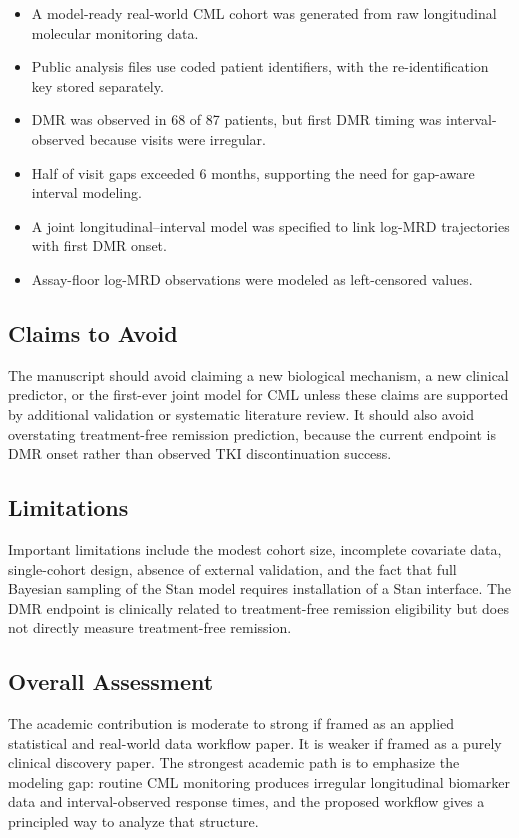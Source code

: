 \begin{itemize}
  \item A model-ready real-world CML cohort was generated from raw longitudinal molecular monitoring data.
  \item Public analysis files use coded patient identifiers, with the re-identification key stored separately.
  \item DMR was observed in 68 of 87 patients, but first DMR timing was interval-observed because visits were irregular.
  \item Half of visit gaps exceeded 6 months, supporting the need for gap-aware interval modeling.
  \item A joint longitudinal--interval model was specified to link log-MRD trajectories with first DMR onset.
  \item Assay-floor log-MRD observations were modeled as left-censored values.
\end{itemize}

\subsection{Claims to Avoid}

The manuscript should avoid claiming a new biological mechanism, a new clinical predictor, or the first-ever joint model for CML unless these claims are supported by additional validation or systematic literature review. It should also avoid overstating treatment-free remission prediction, because the current endpoint is DMR onset rather than observed TKI discontinuation success.

\subsection{Limitations}

Important limitations include the modest cohort size, incomplete covariate data, single-cohort design, absence of external validation, and the fact that full Bayesian sampling of the Stan model requires installation of a Stan interface. The DMR endpoint is clinically related to treatment-free remission eligibility but does not directly measure treatment-free remission.

\subsection{Overall Assessment}

The academic contribution is moderate to strong if framed as an applied statistical and real-world data workflow paper. It is weaker if framed as a purely clinical discovery paper. The strongest academic path is to emphasize the modeling gap: routine CML monitoring produces irregular longitudinal biomarker data and interval-observed response times, and the proposed workflow gives a principled way to analyze that structure.

